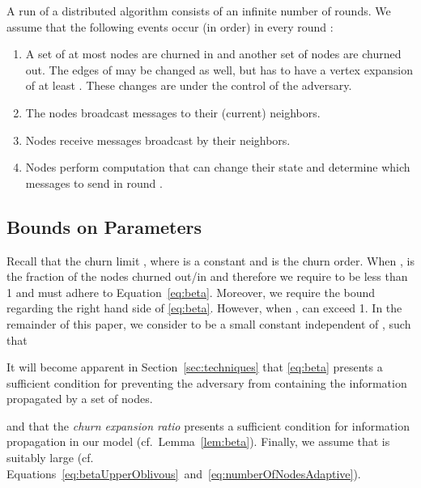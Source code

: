 \documentclass[leqno,11pt]{article}
\begin{document}
A run of a distributed algorithm consists of an infinite number of
rounds. 
We assume that the following events occur (in order) in every round :
\begin{enumerate}
    \item  A set of at most  nodes are churned in and another set of 
      nodes are churned out. The edges of  may be changed as well, but
       has to have a vertex expansion of at least . These changes
      are under the control of the adversary.
\item  The nodes broadcast messages to their (current) neighbors. 
    \item  Nodes receive messages broadcast by their neighbors.
    \item  Nodes perform computation that can change their state and determine
      which messages to send in round .
		\end{enumerate}


\subsection*{Bounds on Parameters}
Recall that the churn limit , where  is a constant and  is the churn order. When ,   is the fraction of the nodes churned out/in and therefore we require   to be less than 1 and must adhere to Equation~\eqref{eq:beta}.
Moreover, we require the bound  regarding the right hand side of \eqref{eq:beta}.
However, when ,   can exceed 1. In the remainder of this paper, we consider  to be a  small
constant independent of , such that


It will become apparent in Section~\ref{sec:techniques} that \eqref{eq:beta} presents a sufficient condition for preventing the adversary from containing the information propagated by a set of  nodes.

and that the \emph{churn expansion ratio}
 presents a sufficient condition for information
propagation in our model (cf.\ Lemma~\ref{lem:beta}).
Finally, we assume that  is suitably large (cf. Equations~\ref{eq:betaUpperOblivous}~and~\ref{eq:numberOfNodesAdaptive}). 
\end{document}
